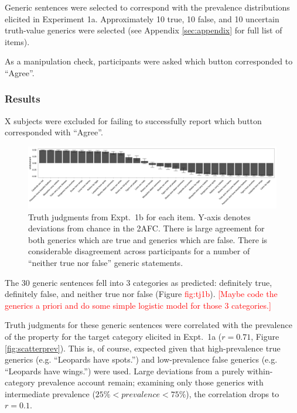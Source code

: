 \documentclass[10pt,letterpaper]{article}
\newcommand{\red}[1]{\textcolor{Red}{#1}}
\begin{document}
Generic sentences were selected to correspond with the prevalence distributions elicited in Experiment 1a. Approximately 10 true, 10 false, and 10 uncertain truth-value generics were selected (see Appendix \ref{sec:appendix} for full list of items).

As a manipulation check, participants were asked which button corresponded to ``Agree''.

\subsubsection{Results}

X subjects were excluded for failing to successfully report which button corresponded with ``Agree''. 


\begin{figure}
\centering
    \includegraphics[width=\columnwidth]{truhtjudge_n100}
    \caption{Truth judgments from Expt.~1b for each item. Y-axis denotes deviations from chance in the 2AFC. There is large agreement for both generics which are true and generics which are false. There is considerable disagreement across participants for a number of ``neither true nor false'' generic statements. }
  \label{fig:tj1b}
\end{figure}


The 30 generic sentences fell into 3 categories as predicted: definitely true, definitely false, and neither true nor false (Figure \red{fig:tj1b}).  \red{[Maybe code the generics a priori and do some simple logistic model for those 3 categories.]}

Truth judgments for these generic sentences were correlated with the prevalence of the property for the target category elicited in Expt.~1a ($r = 0.71$, Figure \ref{fig:scatterprev}). This is, of course, expected given that high-prevalence true generics (e.g. ``Leopards have spots.'') and low-prevalence false generics (e.g. ``Leopards have wings.'') were used. Large deviations from a purely within-category prevalence account remain; examining only those generics with intermediate prevalence ($ 25\% < prevalence < 75\%$), the correlation drops to $r=0.1$. 
\end{document}
